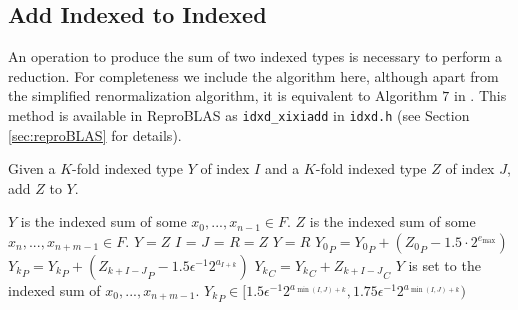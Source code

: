 \subsection{Add Indexed to Indexed}
    \label{sec:primitiveops_addindexedtoindexed}
    An operation to produce the sum of two indexed types is necessary to
    perform a reduction. For completeness we include the algorithm here,
    although apart from the simplified renormalization algorithm, it is
    equivalent to Algorithm $7$ in \cite{repsum}.
    This method is available in ReproBLAS as \texttt{idxd\_xixiadd} in \texttt{idxd.h} (see Section \ref{sec:reproBLAS} for details).

    \begin{samepage}
    \begin{alg}
      Given a $K$-fold indexed type $Y$ of index $I$ and a $K$-fold indexed
      type $Z$ of index $J$, add $Z$ to $Y$.
      \begin{algorithmic}[1]
        \Require
          \Statex $Y$ is the indexed sum of some $x_0, ..., x_{n - 1} \in F$.
          \Statex $Z$ is the indexed sum of some $x_n, ..., x_{n + m - 1} \in F$.
            \State $Y = Z$
            \State \Return
          \EndIf
            \State \Return
          \EndIf
          \State $I$ = 
          \State $J$ = 
            \State $R = Z$
            \State {}
            \State $Y = R$
            \State \Return
          \EndIf
           \label{alg:addindexedtoindexed:beginfor}
              \State ${Y_{0}}_P = {Y_{0}}_P + ({Z_{0}}_P - 1.5 \cdot 2^{e_{\max}})$\label{alg:addindexedtoindexed:pri0}
            \Else
              \State ${Y_{k}}_P = {Y_{k}}_P + ({Z_{k + I-J}}_P - 1.5 \epsilon^{-1}  2^{a_{I+k}})$\label{alg:addindexedtoindexed:pri}
            \EndIf
            \State ${Y_{k}}_C = {Y_{k}}_C + {Z_{k + I - J}}_C$\label{alg:addindexedtoindexed:car}
          \EndFor
          \State {}\label{alg:addindexedtoindexed:renorm}
        \EndFunction
        \Ensure
          \Statex $Y$ is set to the indexed sum of $x_0, ..., x_{n + m - 1}$.
          \Statex ${Y_k}_P \in [1.5  \epsilon^{-1} 2^{a_{\min(I, J) + k}}, 1.75  \epsilon^{-1} 2^{a_{\min(I, J) + k}})$
      \end{algorithmic}
      \label{alg:addindexedtoindexed}
    \end{alg}
    \end{samepage}

